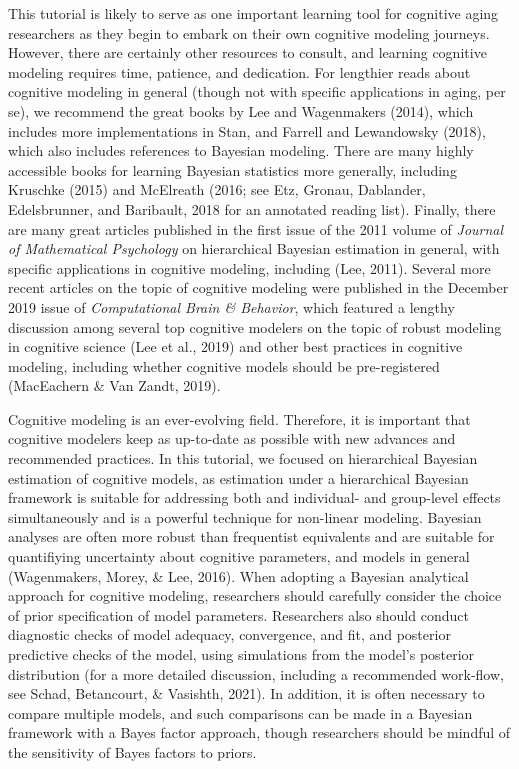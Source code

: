 \documentclass[
  english,
  ,man,floatsintext]{apa6}
\begin{document}
This tutorial is likely to serve as one important learning tool for cognitive aging researchers as they begin to embark on their own cognitive modeling journeys. However, there are certainly other resources to consult, and learning cognitive modeling requires time, patience, and dedication. For lengthier reads about cognitive modeling in general (though not with specific applications in aging, per se), we recommend the great books by Lee and Wagenmakers (2014), which includes more implementations in Stan, and Farrell and Lewandowsky (2018), which also includes references to Bayesian modeling. There are many highly accessible books for learning Bayesian statistics more generally, including Kruschke (2015) and McElreath (2016; see Etz, Gronau, Dablander, Edelsbrunner, and Baribault, 2018 for an annotated reading list). Finally, there are many great articles published in the first issue of the 2011 volume of \emph{Journal of Mathematical Psychology} on hierarchical Bayesian estimation in general, with specific applications in cognitive modeling, including (Lee, 2011). Several more recent articles on the topic of cognitive modeling were published in the December 2019 issue of \emph{Computational Brain \& Behavior}, which featured a lengthy discussion among several top cognitive modelers on the topic of robust modeling in cognitive science (Lee et al., 2019) and other best practices in cognitive modeling, including whether cognitive models should be pre-registered (MacEachern \& Van Zandt, 2019).

Cognitive modeling is an ever-evolving field. Therefore, it is important that cognitive modelers keep as up-to-date as possible with new advances and recommended practices. In this tutorial, we focused on hierarchical Bayesian estimation of cognitive models, as estimation under a hierarchical Bayesian framework is suitable for addressing both and individual- and group-level effects simultaneously and is a powerful technique for non-linear modeling. Bayesian analyses are often more robust than frequentist equivalents and are suitable for quantifiying uncertainty about cognitive parameters, and models in general (Wagenmakers, Morey, \& Lee, 2016). When adopting a Bayesian analytical approach for cognitive modeling, researchers should carefully consider the choice of prior specification of model parameters. Researchers also should conduct diagnostic checks of model adequacy, convergence, and fit, and posterior predictive checks of the model, using simulations from the model's posterior distribution (for a more detailed discussion, including a recommended work-flow, see Schad, Betancourt, \& Vasishth, 2021). In addition, it is often necessary to compare multiple models, and such comparisons can be made in a Bayesian framework with a Bayes factor approach, though researchers should be mindful of the sensitivity of Bayes factors to priors.
\end{document}
